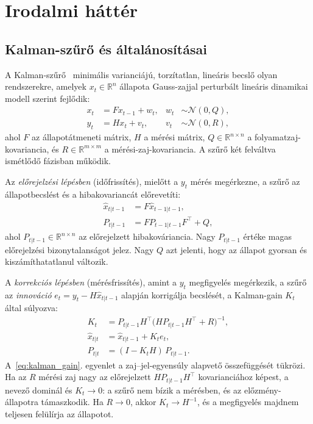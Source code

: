 \chapter{Irodalmi háttér}
\label{ch:irodalom}

\section{Kalman-szűrő és általánosításai}
\label{sec:kalman}

A Kalman-szűrő~\cite{kalman1960new} minimális varianciájú, torzítatlan,
lineáris becslő olyan rendszerekre, amelyek $x_t \in \mathbb{R}^n$ állapota
Gauss-zajjal perturbált lineáris dinamikai modell szerint fejlődik:
\begin{align}
    x_t &= F x_{t-1} + w_t, & w_t &\sim \mathcal{N}(0, Q), \label{eq:kf_process}\\
    y_t &= H x_t   + v_t,   & v_t &\sim \mathcal{N}(0, R), \label{eq:kf_measure}
\end{align}
ahol $F$ az állapotátmeneti mátrix, $H$ a mérési mátrix,
$Q \in \mathbb{R}^{n \times n}$ a folyamatzaj-kovariancia, és
$R \in \mathbb{R}^{m \times m}$ a mérési-zaj-kovariancia.
A szűrő két felváltva ismétlődő fázisban működik.

Az \emph{előrejelzési lépésben} (időfrissítés), mielőtt a $y_t$ mérés
megérkezne, a szűrő az állapotbecslést és a hibakovariancát előrevetíti:
\begin{align}
    \hat{x}_{t|t-1} &= F \hat{x}_{t-1|t-1}, \label{eq:kf_predict_x}\\
    P_{t|t-1}       &= F P_{t-1|t-1} F^\top + Q, \label{eq:kf_predict_P}
\end{align}
ahol $P_{t|t-1} \in \mathbb{R}^{n \times n}$ az előrejelzett hibakováriancia.
Nagy $P_{t|t-1}$ értéke magas előrejelzési bizonytalanságot jelez. Nagy $Q$ azt jelenti,
hogy az állapot gyorsan és kiszámíthatatlanul változik.

A \emph{korrekciós lépésben} (mérésfrissítés), amint a $y_t$ megfigyelés
megérkezik, a szűrő az \emph{innováció} $e_t = y_t - H\hat{x}_{t|t-1}$
alapján korrigálja becslését, a Kalman-gain $K_t$ által súlyozva:
\begin{align}
    K_t           &= P_{t|t-1} H^\top \bigl(H P_{t|t-1} H^\top + R\bigr)^{-1},
                     \label{eq:kalman_gain}\\
    \hat{x}_{t|t} &= \hat{x}_{t|t-1} + K_t e_t, \label{eq:kalman_update}\\
    P_{t|t}       &= (I - K_t H)\,P_{t|t-1}. \label{eq:kf_update_P}
\end{align}
A~\eqref{eq:kalman_gain}. egyenlet a zaj--jel-egyensúly alapvető összefüggését tükrözi.
Ha az $R$ mérési zaj nagy az előrejelzett $H P_{t|t-1} H^\top$
kovarianciához képest, a nevező dominál és $K_t \to 0$: a szűrő nem bízik
a mérésben, és az előzmény-állapotra támaszkodik. Ha $R \to 0$, akkor
$K_t \to H^{-1}$, és a megfigyelés majdnem teljesen felülírja az állapotot.

